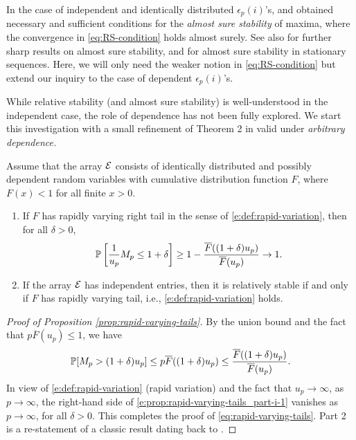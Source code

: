 In the case of independent and identically distributed $\epsilon_p(i)$'s, \citet{barndorff1963limit} and \citet{resnick1973almost} obtained necessary and sufficient conditions for the \emph{almost sure stability} of maxima, where the convergence in \eqref{eq:RS-condition} holds almost surely. See also \cite{klass:1984} for further sharp results on almost sure stability, and \cite{naveau2003almost} for almost sure stability in stationary sequences. 
Here, we will only need the weaker notion in \eqref{eq:RS-condition} but extend our inquiry to the case of dependent $\epsilon_p(i)$'s.

While relative stability (and almost sure stability) is well-understood in the independent case, the role of dependence has not been fully explored.
We start this investigation with a small refinement of Theorem 2 in \citet{gnedenko1943distribution} valid under {\em
arbitrary dependence.}

\begin{proposition} \label{prop:rapid-varying-tails}
Assume that the array ${\cal E}$ consists of identically distributed and possibly dependent random 
variables with cumulative distribution function $F$, where $F(x)<1$ for all finite $x>0$. 
\begin{enumerate}
    \item If $F$ has rapidly varying right tail in the sense of \eqref{e:def:rapid-variation}, then for all $\delta>0$,
        \begin{equation} \label{eq:rapid-varying-tails}
            \P\left[\frac{1}{u_p} M_p\le1+\delta\right] \ge 1 - \frac{\overline F((1+\delta)u_p)}{\overline F(u_p)} \to 1.
        \end{equation}
    \item If the array ${\cal E}$ has independent entries, then it is relatively stable if and only if $F$ has rapidly varying tail, i.e., \eqref{e:def:rapid-variation} holds.
    \label{prop:rapid-varying-tails_part-ii}
\end{enumerate}
\end{proposition}

\begin{proof}[Proof of Proposition \ref{prop:rapid-varying-tails}] 
By the union bound and the fact that 
$p\overline F(u_p) \le 1$, we have
\begin{align}\label{e:prop:rapid-varying-tails_part-i-1}
\P [ M_p > (1+\delta)u_p] \le p \overline F((1+\delta)u_p)
 \le \frac{\overline F((1+\delta)u_p)}{\overline F(u_p)}.
\end{align}
In view of \eqref{e:def:rapid-variation} (rapid variation) and the fact that $u_p\to\infty$, as $p\to\infty$, the right-hand side of \eqref{e:prop:rapid-varying-tails_part-i-1} vanishes 
as $p\to\infty$, for all $\delta>0$.  This completes the proof of \eqref{eq:rapid-varying-tails}. Part 2 is a re-statement of a classic result dating back to \cite{gnedenko1943distribution}.
\end{proof}

